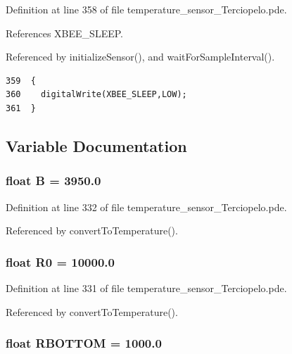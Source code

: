 Definition at line 358 of file temperature\_\-sensor\_\-Terciopelo.pde.

References XBEE\_\-SLEEP.

Referenced by initializeSensor(), and waitForSampleInterval().

\begin{Code}\begin{verbatim}359  {
360    digitalWrite(XBEE_SLEEP,LOW);
361  }
\end{verbatim}
\end{Code}




\subsection{Variable Documentation}
\hypertarget{temperature__sensor___terciopelo_8pde_8188fea1f6709096fe21a3ee084d00d0}{
\subsubsection[{B}]{\setlength{\rightskip}{0pt plus 5cm}float {\bf B} = 3950.0}}
\label{temperature__sensor___terciopelo_8pde_8188fea1f6709096fe21a3ee084d00d0}




Definition at line 332 of file temperature\_\-sensor\_\-Terciopelo.pde.

Referenced by convertToTemperature().\hypertarget{temperature__sensor___terciopelo_8pde_735577560ca40e5b6008a98829068904}{
\subsubsection[{R0}]{\setlength{\rightskip}{0pt plus 5cm}float {\bf R0} = 10000.0}}
\label{temperature__sensor___terciopelo_8pde_735577560ca40e5b6008a98829068904}




Definition at line 331 of file temperature\_\-sensor\_\-Terciopelo.pde.

Referenced by convertToTemperature().\hypertarget{temperature__sensor___terciopelo_8pde_d17df5990b551ac9e97a3d60f65833ff}{
\subsubsection[{RBOTTOM}]{\setlength{\rightskip}{0pt plus 5cm}float {\bf RBOTTOM} = 1000.0}}
\label{temperature__sensor___terciopelo_8pde_d17df5990b551ac9e97a3d60f65833ff}




